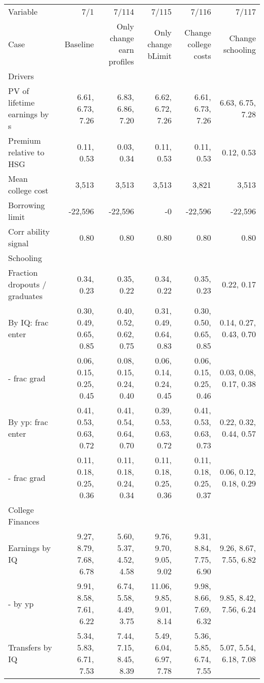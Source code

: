 \begin{tabular}{lrrrrr}
\hline
Variable & 7/1  & 7/114  & 7/115  & 7/116  & 7/117  \\ 
Case & Baseline  & Only change earn profiles  & Only change bLimit  & Change college costs  & Change schooling  \\ 
Drivers &   &   &   &   &   \\ 
PV of lifetime earnings by s & 6.61, 6.73, 7.26  & 6.83, 6.86, 7.20  & 6.62, 6.72, 7.26  & 6.61, 6.73, 7.26  & 6.63, 6.75, 7.28  \\ 
Premium relative to HSG & 0.11, 0.53  & 0.03, 0.34  & 0.11, 0.53  & 0.11, 0.53  & 0.12, 0.53  \\ 
Mean college cost & 3,513  & 3,513  & 3,513  & 3,821  & 3,513  \\ 
Borrowing limit & -22,596  & -22,596  & -0  & -22,596  & -22,596  \\ 
Corr ability signal & 0.80  & 0.80  & 0.80  & 0.80  & 0.80  \\ 
\hline
Schooling &   &   &   &   &   \\ 
Fraction dropouts / graduates & 0.34, 0.23  & 0.35, 0.22  & 0.34, 0.22  & 0.35, 0.23  & 0.22, 0.17  \\ 
By IQ: frac enter & 0.30, 0.49, 0.65, 0.85  & 0.40, 0.52, 0.62, 0.75  & 0.31, 0.49, 0.64, 0.83  & 0.30, 0.50, 0.65, 0.85  & 0.14, 0.27, 0.43, 0.70  \\ 
- frac grad & 0.06, 0.15, 0.25, 0.45  & 0.08, 0.15, 0.24, 0.40  & 0.06, 0.14, 0.24, 0.45  & 0.06, 0.15, 0.25, 0.46  & 0.03, 0.08, 0.17, 0.38  \\ 
By yp: frac enter & 0.41, 0.53, 0.63, 0.72  & 0.41, 0.54, 0.64, 0.70  & 0.39, 0.53, 0.63, 0.72  & 0.41, 0.53, 0.63, 0.73  & 0.22, 0.32, 0.44, 0.57  \\ 
- frac grad & 0.11, 0.18, 0.25, 0.36  & 0.11, 0.18, 0.24, 0.34  & 0.11, 0.18, 0.25, 0.36  & 0.11, 0.18, 0.25, 0.37  & 0.06, 0.12, 0.18, 0.29  \\ 
\hline
College Finances &   &   &   &   &   \\ 
Earnings by IQ & 9.27, 8.79, 7.68, 6.78  & 5.60, 5.37, 4.52, 4.58  & 9.76, 9.70, 9.05, 9.02  & 9.31, 8.84, 7.75, 6.90  & 9.26, 8.67, 7.55, 6.82  \\ 
- by yp & 9.91, 8.58, 7.61, 6.22  & 6.74, 5.58, 4.49, 3.75  & 11.06, 9.85, 9.01, 8.14  & 9.98, 8.66, 7.69, 6.32  & 9.85, 8.42, 7.56, 6.24  \\ 
Transfers by IQ & 5.34, 5.83, 6.71, 7.53  & 7.44, 7.15, 8.45, 8.39  & 5.49, 6.04, 6.97, 7.78  & 5.36, 5.85, 6.74, 7.55  & 5.07, 5.54, 6.18, 7.08  \\ 

\end{tabular}
